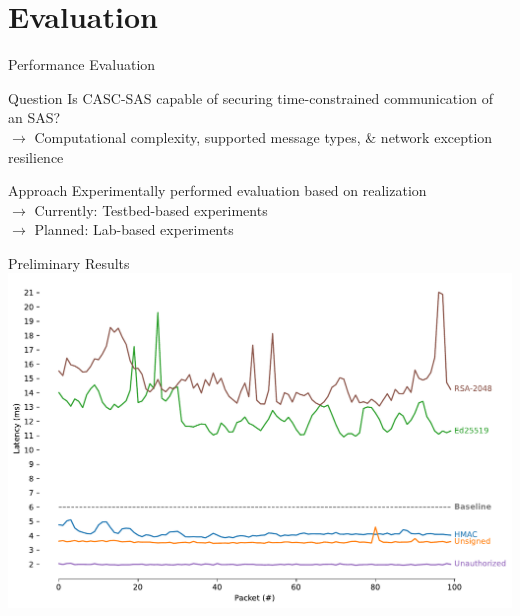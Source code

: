\documentclass[en]{sdqbeamer}
\begin{document}
\section{Evaluation}
\begin{frame}{Performance Evaluation}
    \begin{greenblock}{Question}
        Is CASC-SAS capable of securing time-constrained communication of an SAS?
        \\$\rightarrow$ Computational complexity, supported message types, \& network exception resilience
    \end{greenblock}
    \begin{blueblock}{Approach}
        Experimentally performed evaluation based on realization
        \\$\rightarrow$ Currently: Testbed-based experiments
        \\$\rightarrow$ Planned: Lab-based experiments
    \end{blueblock}
\end{frame}
\begin{frame}{Preliminary Results}
    \centering
    \includegraphics[height=0.78\textheight]{./figures/rtt-estimation-results.pdf}
\end{frame}
\end{document}
